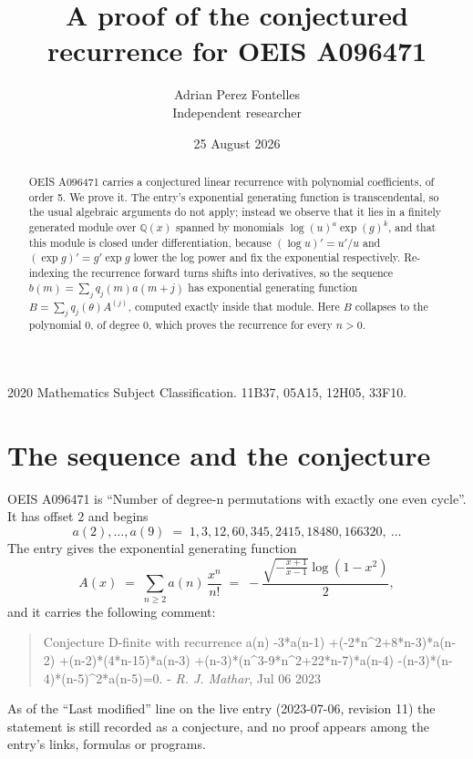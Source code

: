 \documentclass[11pt,a4paper]{article}
\title{A proof of the conjectured recurrence for OEIS A096471}
\author{Adrian Perez Fontelles\\ \small Independent researcher}
\date{25 August 2026}
\theoremstyle{plain}
\theoremstyle{definition}
\begin{document}
\maketitle

\begin{abstract}
OEIS A096471 carries a conjectured linear recurrence with polynomial coefficients, of
order 5. We prove it. The entry's exponential generating function is
transcendental, so the usual algebraic arguments do not apply; instead we observe that it
lies in a finitely generated module over $\mathbb{Q}(x)$ spanned by monomials
$\log(u)^{a}\exp(g)^{k}$, and that this module is closed under differentiation, because
$(\log u)'=u'/u$ and $(\exp g)'=g'\exp g$ lower the log power and fix the exponential
respectively. Re-indexing the recurrence forward turns shifts into derivatives, so the
sequence $b(m)=\sum_{j}q_{j}(m)a(m+j)$ has exponential generating function
$B=\sum_{j}q_{j}(\theta)A^{(j)}$, computed exactly inside that module. Here $B$ collapses
to the polynomial $0$, of degree $0$, which proves the recurrence for every
$n>0$.
\end{abstract}

\noindent\small 2020 Mathematics Subject Classification. 11B37, 05A15, 12H05, 33F10.\normalsize

\section{The sequence and the conjecture}

OEIS A096471 is ``Number of degree-n permutations with exactly one even cycle''. It has offset $2$ and begins
\[
a(2),\dots,a(9)\;=\;1, 3, 12, 60, 345, 2415, 18480, 166320,\ \dots
\]
The entry gives the exponential generating function
\begin{equation}\label{eq:gf}
A(x)\;=\;\sum_{n\ge 2} a(n)\,\frac{x^{n}}{n!}\;=\;- \frac{\sqrt{- \frac{x + 1}{x - 1}} \log{\left(1 - x^{2} \right)}}{2} ,
\end{equation}
and it carries the following comment:
\begin{quote}\small
Conjecture D-finite with recurrence a(n) -3*a(n-1) +(-2*n\^{}2+8*n-3)*a(n-2) +(n-2)*(4*n-15)*a(n-3) +(n-3)*(n\^{}3-9*n\^{}2+22*n-7)*a(n-4) -(n-3)*(n-4)*(n-5)\^{}2*a(n-5)=0. - \emph{R. J. Mathar}, Jul 06 2023
\end{quote}
As of the ``Last modified'' line on the live entry (2023-07-06, revision 11) the
statement is still recorded as a conjecture, and no proof appears among the entry's links,
formulas or programs.
\end{document}
